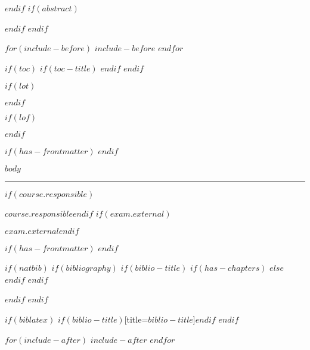 \documentclass[
$if(fontsize)$$fontsize$,$endif$%
$if(lang)$$babel-lang$,$endif$%
$if(papersize)$$papersize$paper,$endif$%
$for(classoption)$$classoption$$sep$,$endfor$]%
{article}%
\begin{document}
$endif$
$if(abstract)$
\begin{abstract}
$abstract$
\end{abstract}
$endif$
$endif$

$for(include-before)$
$include-before$
$endfor$

$if(toc)$
$if(toc-title)$
\renewcommand*\contentsname{$toc-title$}
$endif$
$endif$

$if(lot)$
\listoftables
$endif$

$if(lof)$
\listoffigures
$endif$

$if(has-frontmatter)$
\mainmatter
$endif$

$body$


\vspace{10pt}\vfill\hrule\vspace{10pt}
\begin{description}
$if(course.responsible)$
  \item[Course Responsible:] $course.responsible$$endif$
$if(exam.external)$
  \item[External Examiner:] $exam.external$$endif$
\end{description}

$if(has-frontmatter)$
\backmatter
$endif$

$if(natbib)$
$if(bibliography)$
$if(biblio-title)$
$if(has-chapters)$
\renewcommand\bibname{$biblio-title$}
$else$
\renewcommand\refname{$biblio-title$}
$endif$ %
$endif$ %

$endif$ %
$endif$ %

$if(biblatex)$
\printbibliography$if(biblio-title)$[title=$biblio-title$]$endif$
$endif$

$for(include-after)$
$include-after$
$endfor$
\end{document}
